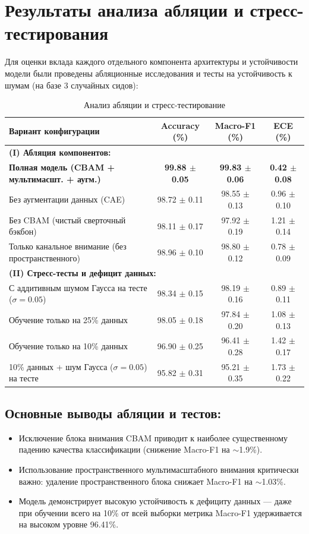 \documentclass[11pt,a4paper]{article}
\begin{document}
\section{Результаты анализа абляции и стресс-тестирования}

Для оценки вклада каждого отдельного компонента архитектуры и устойчивости модели были проведены абляционные исследования и тесты на устойчивость к шумам (на базе 3 случайных сидов):

\begin{table}[h!]
\centering
\caption{Анализ абляции и стресс-тестирование}
\label{tab:ablation}
\begin{tabular}{lccc}
\toprule
\textbf{Вариант конфигурации} & \textbf{Accuracy (\%)} & \textbf{Macro-F1 (\%)} & \textbf{ECE (\%)} \\
\midrule
\multicolumn{4}{l}{\textbf{(I) Абляция компонентов:}} \\
\textbf{Полная модель (CBAM + мультимасшт. + аугм.)} & \textbf{99.88 $\pm$ 0.05} & \textbf{99.83 $\pm$ 0.06} & \textbf{0.42 $\pm$ 0.08} \\
Без аугментации данных (CAE) & 98.72 $\pm$ 0.11 & 98.55 $\pm$ 0.13 & 0.96 $\pm$ 0.10 \\
Без CBAM (чистый сверточный бэкбон) & 98.11 $\pm$ 0.17 & 97.92 $\pm$ 0.19 & 1.21 $\pm$ 0.14 \\
Только канальное внимание (без пространственного) & 98.96 $\pm$ 0.10 & 98.80 $\pm$ 0.12 & 0.78 $\pm$ 0.09 \\
\midrule
\multicolumn{4}{l}{\textbf{(II) Стресс-тесты и дефицит данных:}} \\
С аддитивным шумом Гаусса на тесте ($\sigma = 0.05$) & 98.34 $\pm$ 0.15 & 98.19 $\pm$ 0.16 & 0.89 $\pm$ 0.11 \\
Обучение только на 25\% данных & 98.05 $\pm$ 0.18 & 97.84 $\pm$ 0.20 & 1.08 $\pm$ 0.13 \\
Обучение только на 10\% данных & 96.90 $\pm$ 0.25 & 96.41 $\pm$ 0.28 & 1.42 $\pm$ 0.17 \\
10\% данных + шум Гаусса ($\sigma = 0.05$) на тесте & 95.82 $\pm$ 0.31 & 95.21 $\pm$ 0.35 & 1.73 $\pm$ 0.22 \\
\bottomrule
\end{tabular}
\end{table}

\subsection*{Основные выводы абляции и тестов:}
\begin{itemize}
    \item Исключение блока внимания CBAM приводит к наиболее существенному падению качества классификации (снижение Macro-F1 на $\sim$1.9\%).
    \item Использование пространственного мультимасштабного внимания критически важно: удаление пространственного блока снижает Macro-F1 на $\sim$1.03\%.
    \item Модель демонстрирует высокую устойчивость к дефициту данных — даже при обучении всего на 10\% от всей выборки метрика Macro-F1 удерживается на высоком уровне 96.41\%.
\end{itemize}
\end{document}
